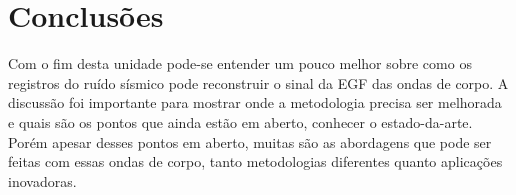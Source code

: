 \documentclass[paper,twocolumn]{geophysics}
\begin{document}
\section*{Conclusões}

Com o fim desta unidade pode-se entender um pouco melhor sobre como os registros do ruído sísmico pode reconstruir o sinal da EGF das ondas de corpo. A discussão foi importante para mostrar onde a metodologia precisa ser melhorada e quais são os pontos que ainda estão em aberto, conhecer o estado-da-arte. Porém apesar desses pontos em aberto, muitas são as abordagens que pode ser feitas com essas ondas de corpo, tanto metodologias diferentes quanto aplicações inovadoras. 



    
\end{document}
